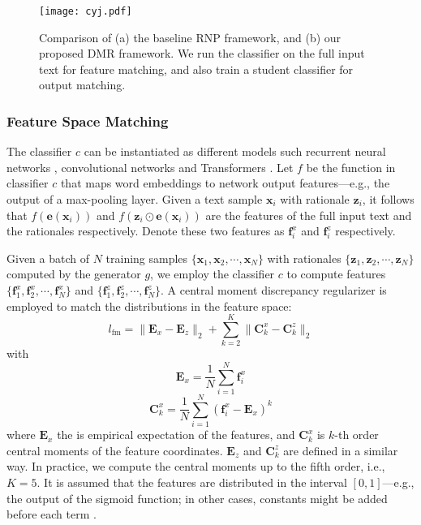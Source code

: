 \documentclass[letterpaper]{article} %
\begin{document}
\begin{figure*}
    \centering
    \texttt{[image: cyj.pdf]}
    \caption{Comparison of (a) the baseline RNP framework, and (b) our proposed DMR framework. We run the classifier on the full input text for feature matching, and also train a student classifier for output matching.}
    \label{fig:DMR_frame}
\end{figure*}

\subsubsection{Feature Space Matching}

The classifier $c$ can be instantiated as different models such recurrent neural networks \cite{Hochreiter1997LongSM}, convolutional networks \cite{Waibel1989PhonemeRU} and Transformers \cite{Vaswani2017AttentionIA}. Let $f$ be the function in classifier $c$ that maps word embeddings to network output features---e.g., the output of a max-pooling layer. Given a text sample $\mathbf{x}_i$ with rationale $\mathbf{z}_i$, it follows that $f(\mathbf{e}(\mathbf{x}_i))$ and $f(\mathbf{z}_i \odot \mathbf{e}(\mathbf{x}_i))$ are the features of the full input text and the rationales respectively. Denote these two features as $\mathbf{f}_i^x$ and $\mathbf{f}_i^z$ respectively.

Given a batch of $N$ training samples $\{\mathbf{x}_1, \mathbf{x}_2, \cdots, \mathbf{x}_N\}$ with rationales $\{\mathbf{z}_1, \mathbf{z}_2, \cdots, \mathbf{z}_N\}$ computed by the generator $g$, we employ the classifier $c$ to compute features $\{\mathbf{f}_1^x, \mathbf{f}_2^x, \cdots, \mathbf{f}_N^x\}$ and $\{\mathbf{f}_1^z, \mathbf{f}_2^z, \cdots, \mathbf{f}_N^z\}$. A central moment discrepancy regularizer \cite{Zellinger2017CentralMD} is employed to match the distributions in the feature space:
\[
l_\text{fm} = \|\mathbf{E}_x - \mathbf{E}_z\|_2 + \sum_{k = 2}^K \|\mathbf{C}_k^x - \mathbf{C}_k^z\|_2
\]
with
\[
\mathbf{E}_x = \frac{1}{N} \sum_{i = 1}^N \mathbf{f}_i^x
\]
\[
\mathbf{C}_k^x = \frac{1}{N} \sum_{i = 1}^N (\mathbf{f}_i^x - \mathbf{E}_x)^k
\]
where $\mathbf{E}_x$ the is empirical expectation of the features, and $\mathbf{C}_k^x$ is $k$-th order central moments of the feature coordinates. $\mathbf{E}_z$ and $\mathbf{C}_k^z$ are defined in a similar way. In practice, we compute the central moments up to the fifth order, i.e., $K = 5$. It is assumed that the features are distributed in the interval $[0, 1]$---e.g., the output of the sigmoid function; in other cases, constants might be added before each term \cite{Zellinger2017CentralMD}.
\end{document}
